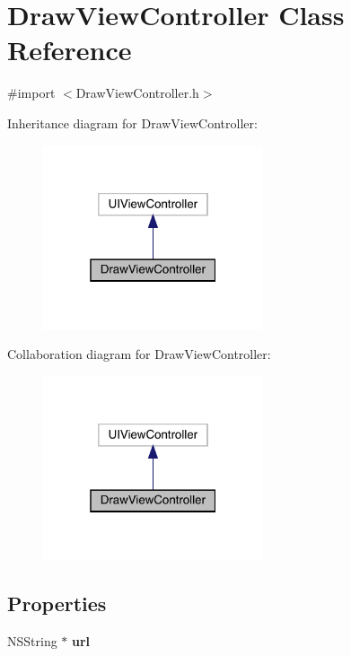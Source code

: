 \hypertarget{interface_draw_view_controller}{}\section{Draw\+View\+Controller Class Reference}
\label{interface_draw_view_controller}


{\ttfamily \#import $<$Draw\+View\+Controller.\+h$>$}



Inheritance diagram for Draw\+View\+Controller\+:\nopagebreak
\begin{figure}[H]
\begin{center}
\leavevmode
\includegraphics[width=184pt]{interface_draw_view_controller__inherit__graph}
\end{center}
\end{figure}


Collaboration diagram for Draw\+View\+Controller\+:\nopagebreak
\begin{figure}[H]
\begin{center}
\leavevmode
\includegraphics[width=184pt]{interface_draw_view_controller__coll__graph}
\end{center}
\end{figure}
\subsection*{Properties}
\begin{DoxyCompactItemize}
\item 
\mbox{\label{interface_draw_view_controller_a9913a2ae9b2eb8d80e88403aa01ec229}} 
N\+S\+String $\ast$ {\bfseries url}
\end{DoxyCompactItemize}


